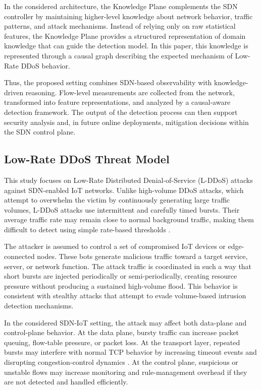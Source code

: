 \documentclass[journal]{IEEEtran}
\begin{document}
In the considered architecture, the Knowledge Plane complements the SDN controller by maintaining higher-level knowledge about network behavior, traffic patterns, and attack mechanisms. Instead of relying only on raw statistical features, the Knowledge Plane provides a structured representation of domain knowledge that can guide the detection model. In this paper, this knowledge is represented through a causal graph describing the expected mechanism of Low-Rate DDoS behavior.

Thus, the proposed setting combines SDN-based observability with knowledge-driven reasoning. Flow-level measurements are collected from the network, transformed into feature representations, and analyzed by a causal-aware detection framework. The output of the detection process can then support security analysis and, in future online deployments, mitigation decisions within the SDN control plane.

\subsection{Low-Rate DDoS Threat Model}
\label{subsec:threat_model}

This study focuses on Low-Rate Distributed Denial-of-Service (L-DDoS) attacks against SDN-enabled IoT networks. Unlike high-volume DDoS attacks, which attempt to overwhelm the victim by continuously generating large traffic volumes, L-DDoS attacks use intermittent and carefully timed bursts. Their average traffic rate may remain close to normal background traffic, making them difficult to detect using simple rate-based thresholds \cite{kuzmanovic2003lowrate}.

The attacker is assumed to control a set of compromised IoT devices or edge-connected nodes. These bots generate malicious traffic toward a target service, server, or network function. The attack traffic is coordinated in such a way that short bursts are injected periodically or semi-periodically, creating resource pressure without producing a sustained high-volume flood. This behavior is consistent with stealthy attacks that attempt to evade volume-based intrusion detection mechanisms.

In the considered SDN-IoT setting, the attack may affect both data-plane and control-plane behavior. At the data plane, bursty traffic can increase packet queuing, flow-table pressure, or packet loss. At the transport layer, repeated bursts may interfere with normal TCP behavior by increasing timeout events and disrupting congestion-control dynamics \cite{kuzmanovic2003lowrate}. At the control plane, suspicious or unstable flows may increase monitoring and rule-management overhead if they are not detected and handled efficiently.
\end{document}
